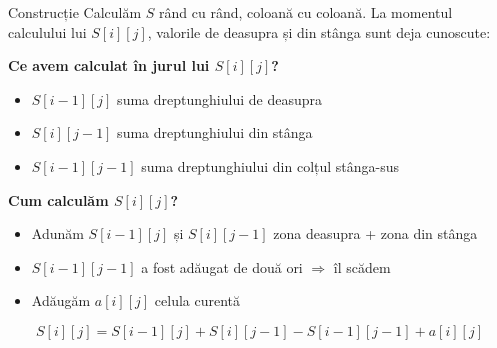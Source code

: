 ﻿\documentclass{beamer}
\begin{document}
\begin{frame}[shrink]{Construcție}
  Calculăm $S$ rând cu rând, coloană cu coloană. La momentul calculului lui $S[i][j]$, valorile de deasupra și din stânga sunt deja cunoscute:

  \smallskip
  \textbf{Ce avem calculat în jurul lui $S[i][j]$?}
  \begin{itemize}
    \item $S[i{-}1][j]$ \textemdash{} suma dreptunghiului de deasupra
    \item $S[i][j{-}1]$ \textemdash{} suma dreptunghiului din stânga
    \item $S[i{-}1][j{-}1]$ \textemdash{} suma dreptunghiului din colțul stânga-sus
  \end{itemize}

  \smallskip
  \textbf{Cum calculăm $S[i][j]$?}
  \begin{itemize}
    \item Adunăm $S[i{-}1][j]$ și $S[i][j{-}1]$ \textemdash{} zona deasupra + zona din stânga
    \item $S[i{-}1][j{-}1]$ a fost adăugat de două ori $\Rightarrow$ îl scădem
    \item Adăugăm $a[i][j]$ \textemdash{} celula curentă
  \end{itemize}

  \[S[i][j] = S[i{-}1][j] + S[i][j{-}1] - S[i{-}1][j{-}1] + a[i][j]\]
\end{frame}
\end{document}
